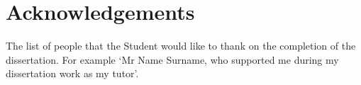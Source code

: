 
\chapter*{\centering Acknowledgements}
\begin{spacing}{1.5}
\vspace{-0.2in}
\setlength{\parskip}{0.3in}
\setlength{\parindent}{0in}


The list of people that the Student would like to thank on the completion of the dissertation. For example ‘Mr Name Surname, who supported me during my dissertation work as my tutor’.

\end{spacing}
\newpage
